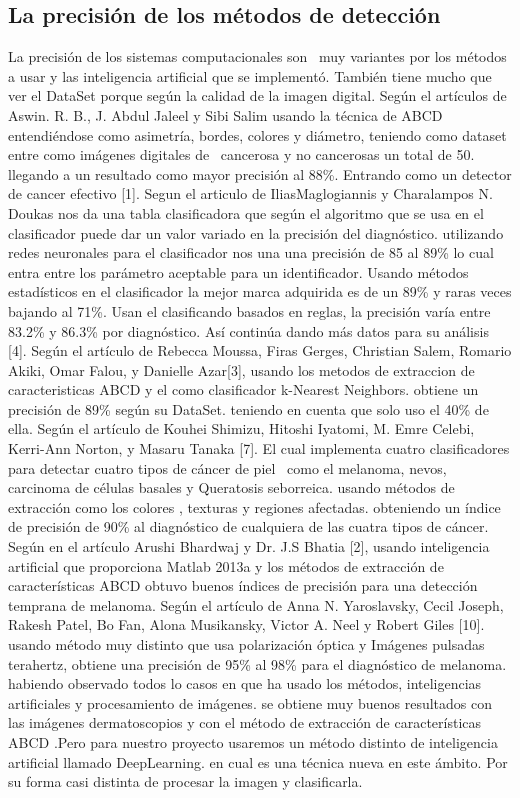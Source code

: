 \documentclass[a4paper]{article}
\begin{document}
\subsection{La precisión de los métodos de detección}

La precisión de los sistemas computacionales son  muy variantes por los métodos a usar y las inteligencia artificial que se implementó. También tiene mucho que ver el DataSet porque según la calidad de la imagen digital.
Según el artículos de Aswin. R. B., J. Abdul Jaleel y Sibi Salim usando la técnica de ABCD entendiéndose como asimetría, bordes, colores y diámetro, teniendo como dataset entre como imágenes digitales de  cancerosa y no cancerosas un total de 50. llegando a un resultado como mayor precisión al 88\%. Entrando como un detector de cancer efectivo [1].
Segun el articulo de IliasMaglogiannis y Charalampos N. Doukas nos da una tabla clasificadora que según el algoritmo que se usa en el clasificador puede dar un valor variado en la precisión del diagnóstico. utilizando redes neuronales para el clasificador nos una una precisión de 85 al 89\% lo cual entra entre los parámetro aceptable para un identificador. Usando métodos estadísticos en el clasificador la mejor marca adquirida es de un 89\% y raras veces bajando al 71\%. Usan el clasificando basados en reglas, la precisión varía entre 83.2\% y 86.3\% por diagnóstico. Así continúa dando más datos para su análisis [4].
Según el artículo de Rebecca Moussa, Firas Gerges, Christian Salem, Romario Akiki, Omar Falou, y Danielle Azar[3], usando los metodos de extraccion de caracteristicas ABCD y el como clasificador k-Nearest Neighbors. obtiene un precisión de 89\% según su DataSet. teniendo en cuenta que solo uso el 40\% de ella.
Según el artículo de Kouhei Shimizu, Hitoshi Iyatomi, M. Emre Celebi, Kerri-Ann Norton, y Masaru Tanaka [7]. El cual implementa cuatro clasificadores para detectar cuatro tipos de cáncer de piel  como el melanoma, nevos, carcinoma de células basales y Queratosis seborreica. usando métodos de extracción como los colores , texturas y regiones afectadas. obteniendo un índice de precisión de 90\% al diagnóstico de cualquiera de las cuatra tipos de cáncer.
Según en el artículo Arushi Bhardwaj y Dr. J.S Bhatia [2], usando inteligencia artificial que proporciona Matlab 2013a y los métodos de extracción de características ABCD obtuvo buenos índices de precisión para una detección temprana de melanoma.
Según el artículo de Anna N. Yaroslavsky, Cecil Joseph, Rakesh Patel, Bo Fan, Alona Musikansky, Victor A. Neel y Robert Giles [10]. usando método muy distinto que usa polarización óptica y Imágenes pulsadas terahertz, obtiene una precisión de 95\% al 98\% para el diagnóstico de melanoma.
habiendo observado todos lo casos en que ha usado los métodos, inteligencias artificiales y procesamiento de imágenes. se obtiene muy buenos resultados con las imágenes dermatoscopios y con el método de extracción de características ABCD .Pero para nuestro proyecto usaremos un método distinto de inteligencia artificial llamado DeepLearning. en cual es una técnica nueva en este ámbito. Por su forma casi distinta de procesar la imagen y clasificarla.
\end{document}
